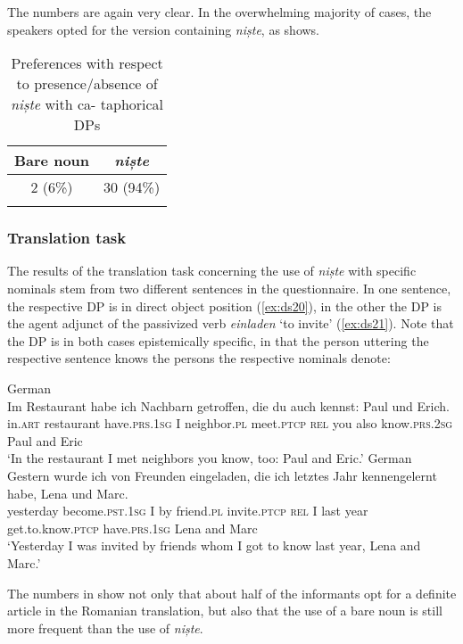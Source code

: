 \documentclass[output=paper,colorlinks,citecolor=brown]{langscibook}
\begin{document}
The numbers are again very clear. In the overwhelming majority of cases, the speakers opted for the version containing \textit{niște}, as  shows.

\begin{table}
\begin{tabular}{cc}
\lsptoprule
Bare noun & \textit{niște}\\\midrule
2 (6\%) & 30 (94\%)\\
\lspbottomrule
\end{tabular}
\caption{Preferences with respect to presence/absence of \textit{niște} with ca- taphorical DPs}
\label{tab:ds3}
\end{table}

\subsubsection{Translation task}\label{sec:ds4.3.2}
The results of the translation task concerning the use of \textit{niște} with specific nominals stem from two different sentences in the questionnaire. In one sentence, the respective DP is in direct object position (\ref{ex:ds20}), in the other the DP is the agent adjunct of the passivized verb \textit{einladen} ‘to invite’ (\ref{ex:ds21}). Note that the DP is in both cases epistemically specific, in that the person uttering the respective sentence knows the persons the respective nominals denote:

\ea\label{ex:ds20} German\\
\gll Im Restaurant habe ich Nachbarn getroffen, die du auch kennst: Paul und Erich.\\
     in.\textsc{art} restaurant   have.\textsc{prs}.1\textsc{sg} I    neighbor.\textsc{pl} meet.\textsc{ptcp} \textsc{rel} you also   know.\textsc{prs}.2\textsc{sg} Paul  and Eric\\
\glt ‘In the restaurant I met neighbors you know, too: Paul and Eric.’
\ex\label{ex:ds21} German\\
\gll Gestern wurde ich von Freunden eingeladen, die ich letztes Jahr kennengelernt habe, Lena und Marc.\\
     yesterday become.\textsc{pst.1sg} I by friend.\textsc{pl} invite.\textsc{ptcp} \textsc{rel} I    last   year get.to.know.\textsc{ptcp} have.\textsc{prs.}1\textsc{sg} Lena and Marc\\
\glt ‘Yesterday I was invited by friends whom I got to know last year, Lena and Marc.’
\z

The numbers in  show not only that about half of the informants opt for a definite article in the Romanian translation, but also that the use of a bare noun is still more frequent than the use of \textit{niște}.
\end{document}
